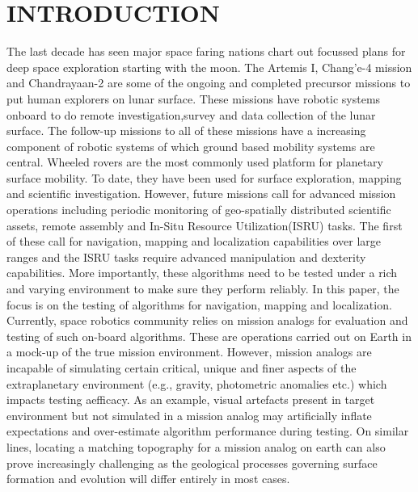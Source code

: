 \documentclass[a4paper, 10pt, conference]{ieeeconf}      %
\begin{document}
\section{INTRODUCTION}

The last decade has seen major space faring nations chart out focussed plans for deep space exploration starting with the moon. The Artemis I\cite{sundahl2020setting},  Chang'e-4 mission\cite{jia2018scientific} and Chandrayaan-2\cite{sundararajan2018overview} are some of the ongoing and completed precursor missions to put human explorers on lunar surface. These missions have robotic systems onboard to do remote investigation,survey and data collection of the lunar surface. The follow-up missions to all of these missions have a increasing component of robotic systems of which ground based mobility systems are central. Wheeled rovers are the most commonly used platform for planetary surface mobility. To date, they have been used for surface exploration, mapping and scientific investigation. However, future missions call for advanced mission operations including periodic monitoring of geo-spatially distributed scientific assets, remote assembly and In-Situ Resource Utilization(ISRU)\cite{green2019situ} tasks. The first of these call for navigation, mapping and localization capabilities over large ranges and the ISRU tasks require advanced manipulation and dexterity capabilities. More importantly, these algorithms need to be tested under a rich and varying environment to make sure they perform reliably. In this paper, the focus is on the testing of algorithms for navigation, mapping and localization. Currently, space robotics community relies on mission analogs for evaluation and testing of such on-board algorithms. These are operations carried out on Earth in a mock-up of the true mission environment. However, mission analogs are incapable of simulating certain critical, unique and finer aspects of the extraplanetary environment (e.g., gravity, photometric anomalies etc.) which impacts testing aefficacy. As an example, visual artefacts present in target environment but not simulated in a mission analog may artificially inflate expectations and over-estimate algorithm performance during testing. On similar lines, locating a matching topography for a mission analog on earth can also prove increasingly challenging as the geological processes governing surface formation and evolution will differ entirely in most cases.    
\end{document}
